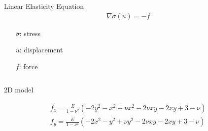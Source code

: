 \documentclass[screen]{beamer}
\begin{document}
\begin{frame}
\begin{columns}
    \begin{column}{\linewidth}
      \begin{block}{Linear Elasticity Equation}
         \begin{align*}
         \nabla \sigma(u) = -f
         \end{align*}
         \begin{itemize}
         \centering
         \item[$\sigma$: ] stress
         \item[$u$: ] displacement
         \item[$f$: ] force
         \item[ ]
         \end{itemize}
      \end{block}
    \end{column}
  \end{columns}
\end{frame}

\begin{frame}
2D model

	\begin{align*}
	f_x = \frac{E}{1-\nu^2} (-2y^2 - x^2 + \nu x^2 - 2\nu xy -2xy + 3 - \nu) \\
	f_y = \frac{E}{1-\nu^2} (-2x^2 - y^2 + \nu y^2 - 2\nu xy -2xy + 3 - \nu) 
	\end{align*}
\end{frame}
\end{document}
